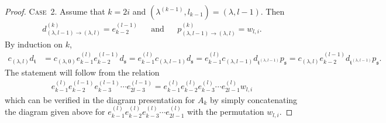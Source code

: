 \documentclass[11pt,a4paper,reqno,svgnames]{amsart}
\theoremstyle{plain}
\theoremstyle{definition}
\numberwithin{equation}{section}
\begin{document}
\begin{proof}
{\textsc{Case~2.}} Assume that $k=2i$ and $(\lambda^{(k-1)},l_{k-1})=(\lambda,l-1)$. Then 
\begin{align*}
d_{(\lambda,l-1)\to(\lambda,l)}^{(k)}=e_{k-2}^{(l-1)} &&\text{and}&& p_{(\lambda,l-1)\to(\lambda,l)}^{(k)}=w_{l,i}. 
\end{align*}
By induction on $k$, 
\begin{align*}
c_{(\lambda,l)}d_\mathfrak{t} &=c_{(\lambda,0)}e_{k-1}^{(l)}e_{k-2}^{(l-1)} d_\mathfrak{s}=e_{k-1}^{(l)}c_{(\lambda,l-1)} d_\mathfrak{s} = e_{k-1}^{(l)}c_{(\lambda,l-1)} d_{\mathfrak{t}^{(\lambda,l-1)}} p_\mathfrak{s} =c_{(\lambda,l)}e_{k-2}^{(l-1)} d_{\mathfrak{t}^{(\lambda,l-1)}} p_\mathfrak{s}.
\end{align*}
The statement will follow from the relation
\begin{align}\label{secondcase}
e_{k-1}^{(l)}e_{k-2}^{(l-1)}e_{k-3}^{(l-1)}\cdots e_{2l-3}^{(l-1)} =e_{k-1}^{(l)}e_{k-2}^{(l)}e_{k-3}^{(l)}\cdots e_{2l-1}^{(l)}w_{l,i}
\end{align}
which can be verified in the diagram presentation for $A_k$ by simply concatenating the diagram given above for $e_{k-1}^{(l)}e_{k-2}^{(l)}e_{k-3}^{(l)}\cdots e_{2l-1}^{(l)}$ with the permutation $w_{l,i}$. 


\end{proof}
\end{document}
